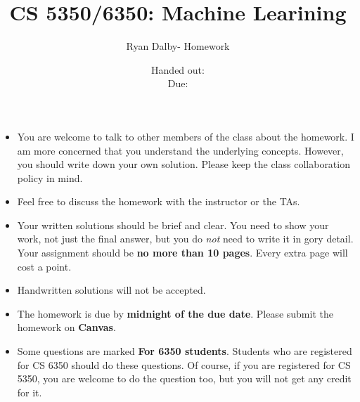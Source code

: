 \documentclass[12pt, fullpage,letterpaper]{article}
\title{CS 5350/6350: Machine Learining \semester}
\author{Ryan Dalby- Homework \assignmentId}
\date{Handed out: \releaseDate\\
  Due: \dueDate}
\begin{document}
\maketitle


\footnotesize
	\begin{itemize}
		\item You are welcome to talk to other members of the class about
		the homework. I am more concerned that you understand the
		underlying concepts. However, you should write down your own
		solution. Please keep the class collaboration policy in mind.
		
		\item Feel free to discuss the homework with the instructor or the TAs.
		
		\item Your written solutions should be brief and clear. You need to
		show your work, not just the final answer, but you do \emph{not}
		need to write it in gory detail. Your assignment should be {\bf no
			more than 10 pages}. Every extra page will cost a point.
		
		\item Handwritten solutions will not be accepted.
		
		\item The homework is due by \textbf{midnight of the due date}. Please submit
		the homework on \textbf{Canvas}.
		
		\item Some questions are marked {\bf For 6350 students}. Students
		who are registered for CS 6350 should do these questions. Of
		course, if you are registered for CS 5350, you are welcome to do
		the question too, but you will not get any credit for it.
		
	\end{itemize}
\end{document}
